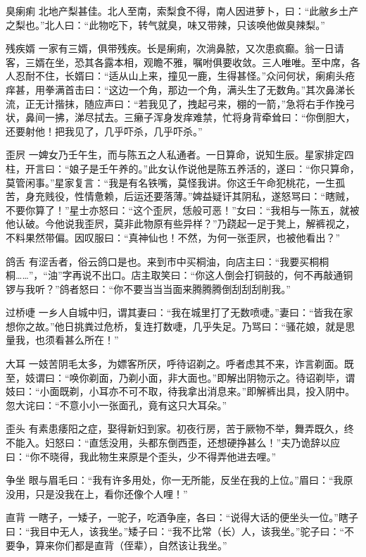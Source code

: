 \documentclass[12pt,UTF8]{ctexbook}
\begin{document}
臭瘌痢
北地产梨甚佳。北人至南，索梨食不得，南人因进萝卜，曰：“此敝乡土产之梨也。”北人曰：“此物吃下，转气就臭，味又带辣，只该唤他做臭辣梨。”

残疾婿
一家有三婿，俱带残疾。长是瘌痢，次淌鼻脓，又次患疯癫。翁一日请客，三婿在坐，恐其各露本相，观瞻不雅，嘱咐俱要收敛。三人唯唯。至中席，各人忍耐不住，长婿曰：“适从山上来，撞见一鹿，生得甚怪。”众问何状，瘌痢头疮痒甚，用拳满首击曰：“这边一个角，那边一个角，满头生了无数角。”其次鼻涕长流，正无计揩抹，随应声曰：“若我见了，拽起弓来，棚的一箭，”急将右手作挽弓状，鼻间一拂，涕尽拭去。三癞子浑身发痒难禁，忙将身背牵耸曰：“你倒胆大，还要射他！把我见了，几乎吓杀，几乎吓杀。”

歪屄
一婢女乃壬午生，而与陈五之人私通者。一日算命，说知生辰。星家排定四柱，开言曰：“娘子是壬午养的。”此女认作说他是陈五养活的，遂曰：“你只算命，莫管闲事。”星家复言：“我是有名铁嘴，莫怪我讲。你这壬午命犯桃花，一生孤苦，身充贱役，性情惫赖，后运还要落薄。”婢益疑讦其阴私，遂怒骂曰：“瞎贼，不要你算了！”星士亦怒曰：“这个歪屄，恁般可恶！”女曰：“我相与一陈五，就被他认破。今他说我歪屄，莫非此物原有些异样？”乃跷起一足于凳上，解裤视之，不料果然带偏。因叹服曰：“真神仙也！不然，为何一张歪屄，也被他看出？”

鸽舌
有涩舌者，俗云鸽口是也。来到市中买桐油，向店主曰：“我要买桐桐桐……”，“油”字再说不出口。店主取笑曰：“你这人倒会打铜鼓的，何不再敲通铜锣与我听？”鸽者怒曰：“你不要当当当面来腾腾腾倒刮刮刮削我。”

过桥啑
一乡人自城中归，谓其妻曰：“我在城里打了无数喷啑。”妻曰：“皆我在家想你之故。”他日挑粪过危桥，复连打数啑，几乎失足。乃骂曰：“骚花娘，就是思量我，也须看甚么所在！”

大耳
一妓苦阴毛太多，为嫖客所厌，呼待诏剃之。呼者虑其不来，诈言剃面。既至，妓谓曰：“唤你剃面，乃剃小面，非大面也。”即解出阴物示之。待诏剃毕，谓妓曰：“小面既剃，小耳亦不可不取，待我拿出消息来。”即解裤出具，投入阴中。忽大诧曰：“不意小小一张面孔，竟有这只大耳朵。”

歪头
有素患痿阳之症，娶得新妇到家。初夜行房，苦于厥物不举，舞弄既久，终不能入。妇怒曰：“直恁没用，头都东倒西歪，还想硬挣甚么！”夫乃诡辞以应曰：“你不晓得，我此物生来原是个歪头，少不得弄他进去哩。”

争坐
眼与眉毛曰：“我有许多用处，你一无所能，反坐在我的上位。”眉曰：“我原没用，只是没我在上，看你还像个人哩！”

直背
一瞎子，一矮子，一驼子，吃酒争座，各曰：“说得大话的便坐头一位。”瞎子曰：“我目中无人，该我坐。”矮子曰：“我不比常（长）人，该我坐。”驼子曰：“不要争，算来你们都是直背（侄辈），自然该让我坐。”
\end{document}
